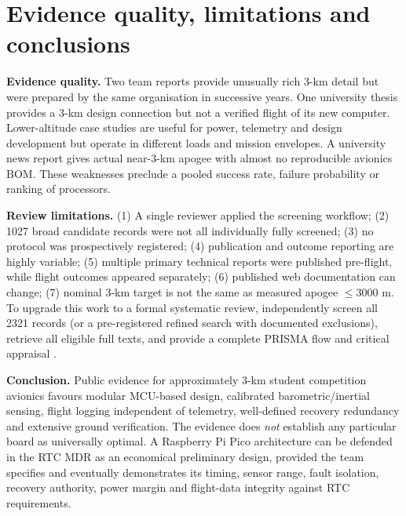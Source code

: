 \documentclass[10pt,a4paper]{article}
\begin{document}
\section{Evidence quality, limitations and conclusions}
\textbf{Evidence quality.} Two team reports provide unusually rich 3-km detail but were prepared by the same organisation in successive years. One university thesis provides a 3-km design connection but not a verified flight of its new computer. Lower-altitude case studies are useful for power, telemetry and design development but operate in different loads and mission envelopes. A university news report gives actual near-3-km apogee with almost no reproducible avionics BOM. These weaknesses preclude a pooled success rate, failure probability or ranking of processors.

\textbf{Review limitations.} (1) A single reviewer applied the screening workflow; (2) 1027 broad candidate records were not all individually fully screened; (3) no protocol was prospectively registered; (4) publication and outcome reporting are highly variable; (5) multiple primary technical reports were published pre-flight, while flight outcomes appeared separately; (6) published web documentation can change; (7) nominal 3-km target is not the same as measured apogee $\leq3000$ m. To upgrade this work to a formal systematic review, independently screen all 2321 records (or a pre-registered refined search with documented exclusions), retrieve all eligible full texts, and provide a complete PRISMA flow and critical appraisal \cite{page2021,rethlefsen2021}.

\textbf{Conclusion.} Public evidence for approximately 3-km student competition avionics favours modular MCU-based design, calibrated barometric/inertial sensing, flight logging independent of telemetry, well-defined recovery redundancy and extensive ground verification. The evidence does \emph{not} establish any particular board as universally optimal. A Raspberry Pi Pico architecture can be defended in the RTC MDR as an economical preliminary design, provided the team specifies and eventually demonstrates its timing, sensor range, fault isolation, recovery authority, power margin and flight-data integrity against RTC requirements.

\printbibliography[title={References}]
\end{document}
